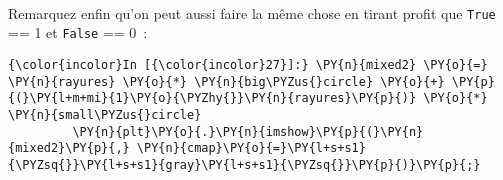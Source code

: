     \begin{center}
    \end{center}
    { \hspace*{\fill} \\}
    
    Remarquez enfin qu'on peut aussi faire la même chose en tirant profit
que \texttt{True} == 1 et \texttt{False} == 0~:

    \begin{Verbatim}[commandchars=\\\{\},frame=single,framerule=0.3mm,rulecolor=\color{cellframecolor}]
{\color{incolor}In [{\color{incolor}27}]:} \PY{n}{mixed2} \PY{o}{=} \PY{n}{rayures} \PY{o}{*} \PY{n}{big\PYZus{}circle} \PY{o}{+} \PY{p}{(}\PY{l+m+mi}{1}\PY{o}{\PYZhy{}}\PY{n}{rayures}\PY{p}{)} \PY{o}{*} \PY{n}{small\PYZus{}circle}
         \PY{n}{plt}\PY{o}{.}\PY{n}{imshow}\PY{p}{(}\PY{n}{mixed2}\PY{p}{,} \PY{n}{cmap}\PY{o}{=}\PY{l+s+s1}{\PYZsq{}}\PY{l+s+s1}{gray}\PY{l+s+s1}{\PYZsq{}}\PY{p}{)}\PY{p}{;}
\end{Verbatim}


    \begin{center}
    \end{center}
    { \hspace*{\fill} \\}
    

    
    
    
